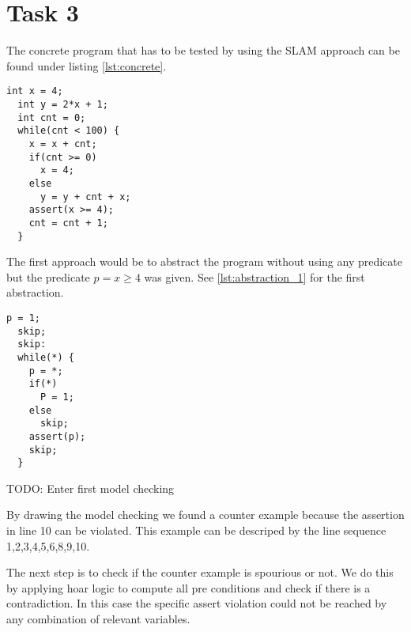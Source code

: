 \chapter{Task 3}
\label{cha:task3}

The concrete program that has to be tested by using the SLAM approach can be found under listing \ref{lst:concrete}.
\begin{lstlisting}[caption=Original source code of task 3, label=lst:concrete]
  int x = 4;
  int y = 2*x + 1;
  int cnt = 0;
  while(cnt < 100) {
    x = x + cnt;
    if(cnt >= 0)
      x = 4;
    else
      y = y + cnt + x;
    assert(x >= 4);
    cnt = cnt + 1;
  }
\end{lstlisting}

The first approach would be to abstract the program without using any predicate but the predicate $p = x \ge 4$ was given. See \ref{lst:abstraction_1} for the first abstraction.

\begin{lstlisting}[caption=First abstraction using predicate $p$, label=lst:abstraction_1]
  p = 1;
  skip;
  skip:
  while(*) {
    p = *;
    if(*)
      P = 1;
    else
      skip;
    assert(p);
    skip;
  }
\end{lstlisting}

TODO: Enter first model checking

By drawing the model checking we found a counter example because the assertion in line 10 can be violated. This example can be descriped by the line sequence 1,2,3,4,5,6,8,9,10.

The next step is to check if the counter example is spourious or not. We do this by applying hoar logic to compute all pre conditions and check if there is a contradiction. In this case the specific assert violation could not be reached by any combination of relevant variables.

